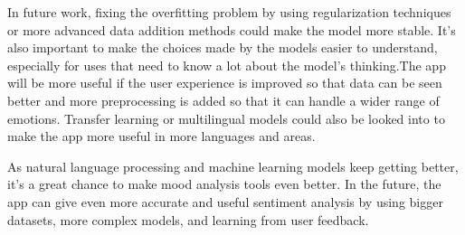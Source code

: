 \documentclass[11pt,a4paper]{article}
\begin{document}
In future work, fixing the overfitting problem by using regularization techniques or more advanced data addition methods could make the model more stable. It's also important to make the choices made by the models easier to understand, especially for uses that need to know a lot about the model's thinking.The app will be more useful if the user experience is improved so that data can be seen better and more preprocessing is added so that it can handle a wider range of emotions. Transfer learning or multilingual models could also be looked into to make the app more useful in more languages and areas.

As natural language processing and machine learning models keep getting better, it's a great chance to make mood analysis tools even better. In the future, the app can give even more accurate and useful sentiment analysis by using bigger datasets, more complex models, and learning from user feedback.








    
\end{document}
